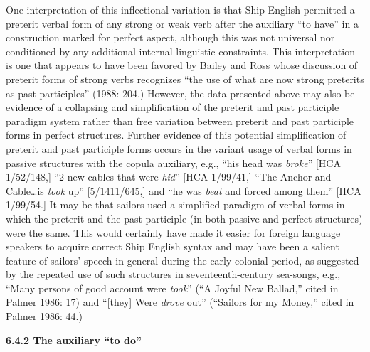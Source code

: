 \begin{styleStandard}
One interpretation of this inflectional variation is that Ship English permitted a preterit verbal form of any strong or weak verb after the auxiliary “to have” in a construction marked for perfect aspect, although this was not universal nor conditioned by any additional internal linguistic constraints. This interpretation is one that appears to have been favored by Bailey and Ross whose discussion of preterit forms of strong verbs recognizes “the use of what are now strong preterits as past participles” (1988: 204.) However, the data presented above may also be evidence of a collapsing and simplification of the preterit and past participle paradigm system rather than free variation between preterit and past participle forms in perfect structures. Further evidence of this potential simplification of preterit and past participle forms occurs in the variant usage of verbal forms in passive structures with the copula auxiliary, e.g., “his head was \textit{broke}” [HCA 1/52/148,] “2 new cables that were \textit{hid}” [HCA 1/99/41,] “The Anchor and Cable…is \textit{took} up” [5/1411/645,] and “he was \textit{beat} and forced among them” [HCA 1/99/54.] It may be that sailors used a simplified paradigm of verbal forms in which the preterit and the past participle (in both passive and perfect structures) were the same. This would certainly have made it easier for foreign language speakers to acquire correct Ship English syntax and may have been a salient feature of sailors’ speech in general during the early colonial period, as suggested by the repeated use of such structures in seventeenth-century sea-songs, e.g., “Many persons of good account were \textit{took}” (“A Joyful New Ballad,” cited in Palmer 1986: 17) and “[they] Were \textit{drove} out” (“Sailors for my Money,” cited in Palmer 1986: 44.) 
\end{styleStandard}


\begin{styleStandard}
\textbf{6.4.2 The auxiliary “to do”}
\end{styleStandard}


